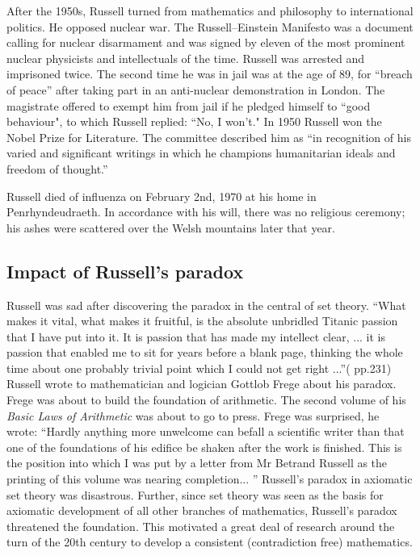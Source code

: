 \documentclass{article}
\begin{document}
After the 1950s, Russell turned from mathematics and philosophy to international politics. He opposed nuclear war. The Russell–Einstein Manifesto was a document calling for nuclear disarmament and was signed by eleven of the most prominent nuclear physicists and intellectuals of the time. Russell was arrested and imprisoned twice. The second time he was in jail was at the age of 89, for ``breach of peace'' after taking part in an anti-nuclear demonstration in London. The magistrate offered to exempt him from jail if he pledged himself to ``good behaviour", to which Russell replied: ``No, I won't." In 1950 Russell won the Nobel Prize for Literature. The committee described him as ``in recognition of his varied and significant writings in which he champions humanitarian ideals and freedom of thought.''

Russell died of influenza on February 2nd, 1970 at his home in Penrhyndeudraeth. In accordance with his will, there was no religious ceremony; his ashes were scattered over the Welsh mountains later that year.

\subsection{Impact of Russell's paradox}

Russell was sad after discovering the paradox in the central of set theory. ``What makes it vital, what makes it fruitful, is the absolute unbridled Titanic passion that I have put into it. It is passion that has made my intellect clear, ... it is passion that enabled me to sit for years before a blank page, thinking the whole time about one probably trivial point which I could not get right ...''(\cite{HanXueTao16} pp.231) Russell wrote to mathematician and logician Gottlob Frege about his paradox. Frege was about to build the foundation of arithmetic. The second volume of his {\em Basic Laws of Arithmetic} was about to go to press. Frege was surprised, he wrote: ``Hardly anything more unwelcome can befall a scientific writer than that one of the foundations of his edifice be shaken after the work is finished. This is the position into which I was put by a letter from Mr Betrand Russell as the printing of this volume was nearing completion... '' Russell's paradox in axiomatic set theory was disastrous. Further, since set theory was seen as the basis for axiomatic development of all other branches of mathematics, Russell's paradox threatened the foundation. This motivated a great deal of research around the turn of the 20th century to develop a consistent (contradiction free) mathematics.
\end{document}
